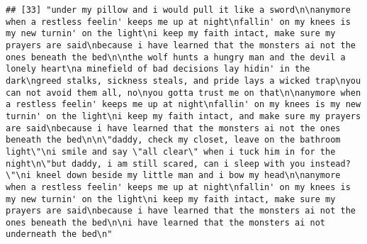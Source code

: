 \documentclass[]{article}
\begin{document}
\begin{verbatim}
## [33] "under my pillow and i would pull it like a sword\n\nanymore when a restless feelin' keeps me up at night\nfallin' on my knees is my new turnin' on the light\ni keep my faith intact, make sure my prayers are said\nbecause i have learned that the monsters ai not the ones beneath the bed\n\nthe wolf hunts a hungry man and the devil a lonely heart\na minefield of bad decisions lay hidin' in the dark\ngreed stalks, sickness steals, and pride lays a wicked trap\nyou can not avoid them all, no\nyou gotta trust me on that\n\nanymore when a restless feelin' keeps me up at night\nfallin' on my knees is my new turnin' on the light\ni keep my faith intact, and make sure my prayers are said\nbecause i have learned that the monsters ai not the ones beneath the bed\n\n\"daddy, check my closet, leave on the bathroom light\"\ni smile and say \"all clear\" when i tuck him in for the night\n\"but daddy, i am still scared, can i sleep with you instead?\"\ni kneel down beside my little man and i bow my head\n\nanymore when a restless feelin' keeps me up at night\nfallin' on my knees is my new turnin' on the light\ni keep my faith intact, make sure my prayers are said\nbecause i have learned that the monsters ai not the ones beneath the bed\n\ni have learned that the monsters ai not underneath the bed\n"                                                                                                                                                                                                                                                                                                                                                                                                                                                                                                                                                                                                                                                                                                                                                                                                                                                                                                                                                                                                                                                                                                                                                                                                                                                                                                                                                                                                                                                                                                                                                                                                                           

\end{verbatim}
\end{document}
